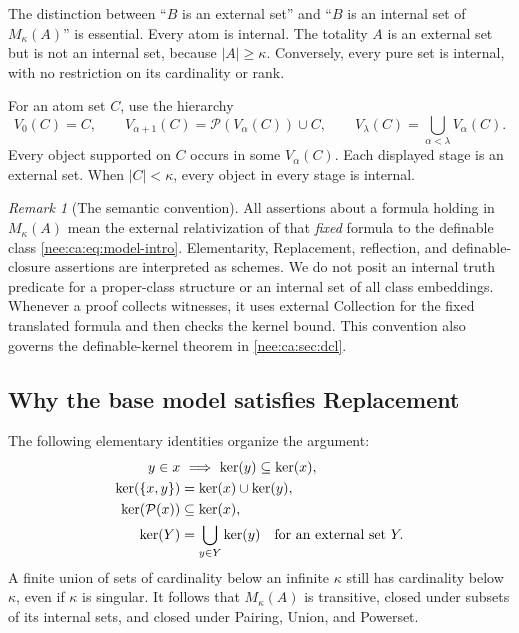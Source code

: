 \documentclass[11pt,letterpaper]{article}
\numberwithin{equation}{section}
\theoremstyle{plain}
\theoremstyle{definition}
\theoremstyle{remark}
\newtheorem{remark}[remark]{Remark}
\newcommand{\kerat}{\operatorname{ker}}
\newcommand{\Mk}{M_\kappa(A)}
\begin{document}
The distinction between ``$B$ is an external set'' and ``$B$ is an internal set of $\Mk$'' is essential. Every atom is internal. The totality $A$ is an external set but is not an internal set, because $|A|\geq\kappa$. Conversely, every pure set is internal, with no restriction on its cardinality or rank.

For an atom set $C$, use the hierarchy
\[
V_0(C)=C,\qquad V_{\alpha+1}(C)=\mathcal P(V_\alpha(C))\cup C,
\qquad V_\lambda(C)=\bigcup_{\alpha<\lambda}V_\alpha(C).
\]
Every object supported on $C$ occurs in some $V_\alpha(C)$. Each displayed stage is an external set. When $|C|<\kappa$, every object in every stage is internal.

\begin{remark}[The semantic convention]\label{nee:ca:rem:semantics}
All assertions about a formula holding in $\Mk$ mean the external relativization of that \emph{fixed} formula to the definable class \eqref{nee:ca:eq:model-intro}. Elementarity, Replacement, reflection, and definable-closure assertions are interpreted as schemes. We do not posit an internal truth predicate for a proper-class structure or an internal set of all class embeddings. Whenever a proof collects witnesses, it uses external Collection for the fixed translated formula and then checks the kernel bound. This convention also governs the definable-kernel theorem in \cref{nee:ca:sec:dcl}.
\end{remark}

\subsection{Why the base model satisfies Replacement}

The following elementary identities organize the argument:
\begin{align}
y\in x&\ \Longrightarrow\ \kerat(y)\subseteq\kerat(x),\label{nee:ca:eq:kernel-basic}\\
\kerat(\{x,y\})&=\kerat(x)\cup\kerat(y),\notag\\
\kerat(\mathcal P(x))&\subseteq\kerat(x),\notag\\
\kerat(Y)&=\bigcup_{y\in Y}\kerat(y)\quad\text{for an external set }Y.\notag
\end{align}
A finite union of sets of cardinality below an infinite $\kappa$ still has cardinality below $\kappa$, even if $\kappa$ is singular. It follows that $\Mk$ is transitive, closed under subsets of its internal sets, and closed under Pairing, Union, and Powerset.
\end{document}
